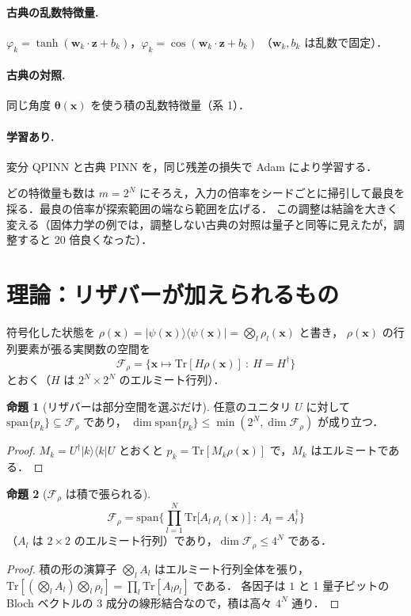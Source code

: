 \documentclass[uplatex,dvipdfmx,a4paper,10pt,twocolumn]{jsarticle}
\theoremstyle{definition}
\newtheorem{proposition}{命題}
\begin{document}
\paragraph{古典の乱数特徴量.} $\varphi_k=\tanh(\bm w_k\cdot\bm z+b_k)$，$\varphi_k=\cos(\bm w_k\cdot\bm z+b_k)$
（$\bm w_k,b_k$ は乱数で固定）．
\paragraph{古典の対照.} 同じ角度 $\bm\theta(\bm x)$ を使う積の乱数特徴量（系 1）．
\paragraph{学習あり.} 変分 QPINN と古典 PINN を，同じ残差の損失で Adam により学習する．

どの特徴量も数は $m=2^N$ にそろえ，入力の倍率をシードごとに掃引して最良を採る．最良の倍率が探索範囲の端なら範囲を広げる．
この調整は結論を大きく変える（固体力学の例では，調整しない古典の対照は量子と同等に見えたが，調整すると 20 倍良くなった）．


\section{理論：リザバーが加えられるもの}
符号化した状態を $\rho(\bm x)=|\psi(\bm x)\rangle\langle\psi(\bm x)|=\bigotimes_l\rho_l(\bm x)$ と書き，
$\rho(\bm x)$ の行列要素が張る実関数の空間を
\begin{equation}
  \mathcal F_\rho=\big\{\bm x\mapsto\mathrm{Tr}[H\rho(\bm x)]\ :\ H=H^\dagger\big\}
\end{equation}
とおく（$H$ は $2^N\times2^N$ のエルミート行列）．

\begin{proposition}[リザバーは部分空間を選ぶだけ]
任意のユニタリ $U$ に対して $\mathrm{span}\{p_k\}\subseteq\mathcal F_\rho$ であり，
$\dim\mathrm{span}\{p_k\}\le\min(2^N,\dim\mathcal F_\rho)$ が成り立つ．
\end{proposition}
\begin{proof}
$M_k=U^\dagger|k\rangle\langle k|U$ とおくと $p_k=\mathrm{Tr}[M_k\rho(\bm x)]$ で，$M_k$ はエルミートである．
\end{proof}

\begin{proposition}[$\mathcal F_\rho$ は積で張られる]
\begin{equation}
  \mathcal F_\rho=\mathrm{span}\Big\{\prod_{l=1}^{N}\mathrm{Tr}\big[A_l\,\rho_l(\bm x)\big]\ :\ A_l=A_l^\dagger\Big\}
\end{equation}
（$A_l$ は $2\times2$ のエルミート行列）であり，$\dim\mathcal F_\rho\le4^N$ である．
\end{proposition}
\begin{proof}
積の形の演算子 $\bigotimes_lA_l$ はエルミート行列全体を張り，$\mathrm{Tr}[(\bigotimes_lA_l)\bigotimes_l\rho_l]=\prod_l\mathrm{Tr}[A_l\rho_l]$ である．
各因子は $1$ と 1 量子ビットの Bloch ベクトルの 3 成分の線形結合なので，積は高々 $4^N$ 通り．
\end{proof}
\end{document}

